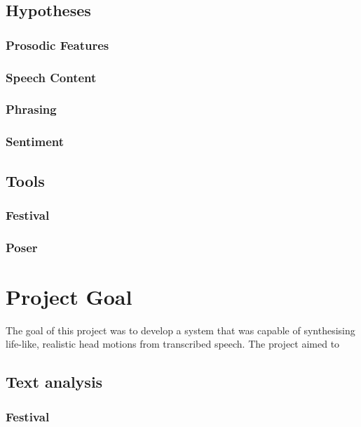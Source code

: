 \documentclass[bsc,frontabs,twoside,singlespacing,parskip]{infthesis}
\begin{document}
\section{Hypotheses}
\subsection{Prosodic Features}
\subsection{Speech Content}
\subsection{Phrasing}
\subsection{Sentiment}
\section{Tools}
\subsection{Festival}
\subsection{Poser}
\chapter{Project Goal}
The goal of this project was to develop a system that was capable of synthesising life-like, realistic head motions from transcribed speech. The project aimed to 
\section{Text analysis}
\subsection{Festival}
\end{document}
